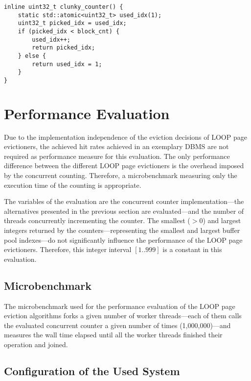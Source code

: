 \begin{@empty}
    \lstset{
        language = [ISO]C++,
        style = basic
    }
    \begin{lstlisting}
inline uint32_t clunky_counter() {
    static std::atomic<uint32_t> used_idx(1);
    uint32_t picked_idx = used_idx;
    if (picked_idx < block_cnt) {
        used_idx++;
        return picked_idx;
    } else {
        return used_idx = 1;
    }
}
    \end{lstlisting}
\end{@empty}

\section[Performance Evaluation]{Performance Evaluation} \label{sec:loop-performance}

    Due to the implementation independence of the eviction decisions of LOOP page evictioners, the achieved hit rates achieved in an exemplary DBMS are not required as performance measure for this evaluation. The only performance difference between the different LOOP page evictioners is the overhead imposed by the concurrent counting. Therefore, a microbenchmark measuring only the execution time of the counting is appropriate.

    The variables of the evaluation are the concurrent counter implementation---the alternatives presented in the previous section are evaluated---and the number of threads concurrently incrementing the counter. The smallest ($>0$) and largest integers returned by the counters---representing the smallest and largest buffer pool indexes---do not significantly influence the performance of the LOOP page evictioners. Therefore, this integer interval $\left[1 .. 999\right]$ is a constant in this evaluation.

\subsection[Microbenchmark]{Microbenchmark}

    The microbenchmark used for the performance evaluation of the LOOP page eviction algorithms forks a given number of worker threads---each of them calls the evaluated concurrent counter a given number of times (1,000,000)---and measures the wall time elapsed until all the worker threads finished their operation and joined.

\subsection[System Configuration]{Configuration of the Used System}

